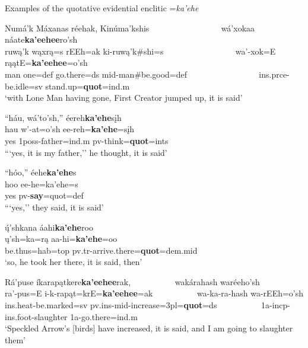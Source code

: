\begin{exe}

\item\label{quotativeevidentialenclitic} Examples of the quotative evidential enclitic =\textit{ka'ehe}

	\begin{xlist}
	
	\item\label{quotativeevidentialenclitic1}
	\glll Numá'k Máxanas réehak, Kinúma'kshis ~ ~ ~ ~ ~ ~ ~ ~ ~ ~ wá'xokaa náate\textbf{ka'eehee}ro'sh\\
	ruwą'k wąxrą=s rEEh=ak ki-ruwą'k\#shi=s ~ ~ ~ ~ ~ ~ ~ ~ ~ ~  wa'-xok=E rąątE=\textbf{ka'eehee}=o'sh\\
	\textnormal{man} \textnormal{one}=def \textnormal{go.there}=ds mid-\textnormal{man}\#\textnormal{be.good}=def ~ ~ ~ ~ ~ ~ ~ ~ ~ ~ ins.prce-\textnormal{be.idle}=sv \textnormal{stand.up}=\textbf{quot}=ind.m\\
	\glt `with Lone Man having gone, First Creator jumped up, it is said' \citep[2]{hollow1973a}

	\item\label{quotativeevidentialenclitic2}
	\glll ``háu, wá'to'sh,'' éereh\textbf{ka'ehe}sįh\\
	hau w'-at=o'sh ee-reh=\textbf{ka'ehe}=sįh\\
	\textnormal{yes} 1poss-\textnormal{father}=ind.m pv-\textnormal{think}=\textbf{quot}=ints\\
	\glt ```yes, it is my father,'' he thought, it is said' \citep[5]{hollow1973a}

	\item\label{quotativeevidentialenclitic3}
	\glll ``hóo,'' éehe\textbf{ka'ehe}s\\
	hoo ee-he=ka'ehe=s\\
	\textnormal{yes} pv-\textbf{say}=quot=def\\
	\glt ```yes,'' they said, it is said' \citep[49]{hollow1973a}

	\item\label{quotativeevidentialenclitic4}
	\glll ų́'shkana áahi\textbf{ka'ehe}roo\\
	ų'sh=ka=rą aa-hi=\textbf{ka'ehe}=oo\\
	\textnormal{be.thus}=hab=top pv.tr-\textnormal{arrive.there}=\textbf{quot}=dem.mid\\
	\glt `so, he took her there, it is said, then' \citep[70]{hollow1973a}

	\item\label{quotativeevidentialenclitic5}
	\glll Rá'puse íkarapątkere\textbf{ka'eehee}rak, ~ ~ ~ ~ ~ ~  wakárahash waréeho'sh\\
	ra'-pus=E i-k-rapąt=krE=\textbf{ka'eehee}=ak ~ ~ ~ ~ ~ ~  wa-ka-ra-hash wa-rEEh=o'sh\\
	ins.heat-\textnormal{be.marked}=sv pv.ins-mid-\textnormal{increase}=3pl=\textbf{quot}=ds ~ ~ ~ ~ ~ ~  1a-incp-ins.foot-\textnormal{slaughter} 1a-\textnormal{go.there}=ind.m\\
	\glt `Speckled Arrow's [birds] have increased, it is said, and I am going to slaughter them' \citep[148]{hollow1973a}


\end{xlist}
\end{exe}
